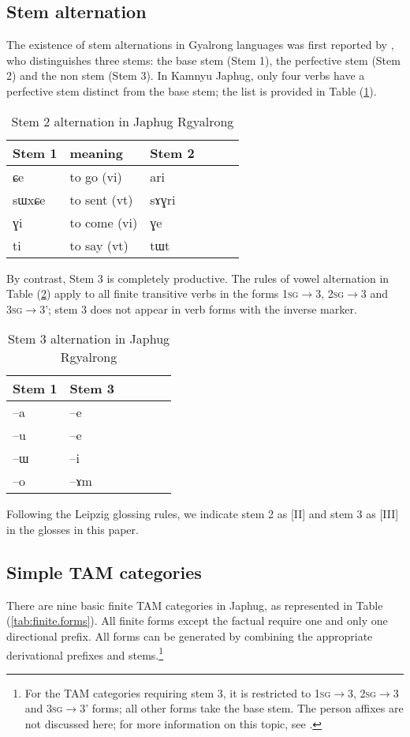 \documentclass[oldfontcommands,oneside,a4paper,11pt]{article}
\newcommand{\ipa}[1]{{\phon \mbox{#1}}} %
\newcommand{\refb}[1]{(\ref{#1})}
\begin{document}
\subsection{Stem alternation} \label{sec:stem}
The existence of stem alternations in Gyalrong languages was first reported by \citet{jackson00puxi}, who distinguishes three stems: the base stem (Stem 1), the perfective stem (Stem 2) and the non stem (Stem 3). In Kamnyu Japhug, only four verbs have a perfective stem distinct from the base stem; the list is provided in Table \refb{tab:stem2}. 


 \begin{table}[H]
\caption{Stem 2 alternation in Japhug Rgyalrong} \label{tab:stem2} \centering
\begin{tabular}{llllll}
\toprule
Stem 1 & meaning &Stem 2 \\
\midrule
\ipa{ɕe}& to go (vi)&  \ipa{ari} \\
\ipa{sɯxɕe}& to sent (vt)  &\ipa{sɤɣri} \\
\ipa{ɣi}& to come (vi)  &\ipa{ɣe} \\
\ipa{ti}& to say (vt)  &\ipa{tɯt} \\
\bottomrule
\end{tabular}
\end{table}

By contrast, Stem 3 is completely productive. The rules of vowel alternation in Table \refb{tab:stem3} apply to all finite transitive verbs in the forms \textsc{1sg}$\rightarrow$3, \textsc{2sg}$\rightarrow$3 and \textsc{3sg}$\rightarrow$3'; stem 3 does not appear in verb forms with the inverse marker.

 \begin{table}[H]
\caption{Stem 3 alternation in Japhug Rgyalrong} \label{tab:stem3} \centering
\begin{tabular}{llllll}
\toprule
Stem 1 & Stem 3 \\
\midrule
\ipa{--a} & \ipa{--e} \\
\ipa{--u} & \ipa{--e} \\
\ipa{--ɯ} & \ipa{--i} \\
\ipa{--o} & \ipa{--ɤm} \\
\bottomrule
\end{tabular}
\end{table}

Following the Leipzig glossing rules, we indicate stem 2 as [II] and stem 3 as [III] in the glosses in this paper.

\subsection{Simple TAM categories} \label{sec:finite.TAM}
There are nine basic finite TAM categories in Japhug, as represented in Table \refb{tab:finite.forms}. All finite forms except the factual require one and only one directional prefix. All forms can be generated  by combining the appropriate derivational prefixes and stems.\footnote{For the TAM categories requiring stem 3, it is restricted to  \textsc{1sg}$\rightarrow$3, \textsc{2sg}$\rightarrow$3 and \textsc{3sg}$\rightarrow$3' forms; all other forms take the base stem.  The person affixes  are not discussed here; for  more information on this topic, see \citet{jacques10inverse}.}
\end{document}
